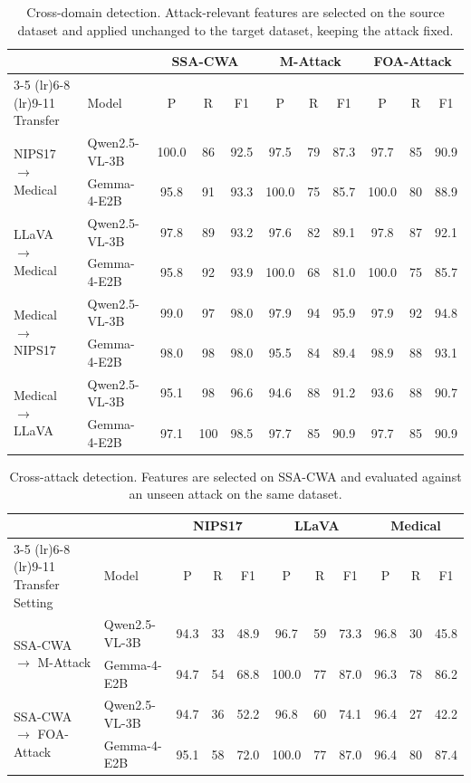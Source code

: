 \begin{table}[t]
\centering
\caption{Cross-domain detection. Attack-relevant features are selected on the source dataset and applied unchanged to the target dataset, keeping the attack fixed.}
\label{tab:appendix-cross-domain}
\begin{tabular}{llccccccccc}
\toprule
& & \multicolumn{3}{c}{SSA-CWA} & \multicolumn{3}{c}{M-Attack} & \multicolumn{3}{c}{FOA-Attack} \\
\cmidrule(lr){3-5} \cmidrule(lr){6-8} \cmidrule(lr){9-11}
Transfer & Model & P & R & F1 & P & R & F1 & P & R & F1 \\
\midrule
\multirow{2}{*}{NIPS17 $\rightarrow$ Medical}
 & Qwen2.5-VL-3B & 100.0 & 86 & 92.5 & 97.5 & 79 & 87.3 & 97.7 & 85 & 90.9 \\
 & Gemma-4-E2B & 95.8 & 91 & 93.3 & 100.0 & 75 & 85.7 & 100.0 & 80 & 88.9 \\
\midrule
\multirow{2}{*}{LLaVA $\rightarrow$ Medical}
 & Qwen2.5-VL-3B & 97.8 & 89 & 93.2 & 97.6 & 82 & 89.1 & 97.8 & 87 & 92.1 \\
 & Gemma-4-E2B & 95.8 & 92 & 93.9 & 100.0 & 68 & 81.0 & 100.0 & 75 & 85.7 \\
\midrule
\multirow{2}{*}{Medical $\rightarrow$ NIPS17}
 & Qwen2.5-VL-3B & 99.0 & 97 & 98.0 & 97.9 & 94 & 95.9 & 97.9 & 92 & 94.8 \\
 & Gemma-4-E2B & 98.0 & 98 & 98.0 & 95.5 & 84 & 89.4 & 98.9 & 88 & 93.1 \\
\midrule
\multirow{2}{*}{Medical $\rightarrow$ LLaVA}
 & Qwen2.5-VL-3B & 95.1 & 98 & 96.6 & 94.6 & 88 & 91.2 & 93.6 & 88 & 90.7 \\
 & Gemma-4-E2B & 97.1 & 100 & 98.5 & 97.7 & 85 & 90.9 & 97.7 & 85 & 90.9 \\
\bottomrule
\end{tabular}
\end{table}

\begin{table}[t]
\centering
\caption{Cross-attack detection. Features are selected on SSA-CWA and evaluated against an unseen attack on the same dataset.}
\label{tab:appendix-cross-attack}
\begin{tabular}{llccccccccc}
\toprule
& & \multicolumn{3}{c}{NIPS17} & \multicolumn{3}{c}{LLaVA} & \multicolumn{3}{c}{Medical} \\
\cmidrule(lr){3-5} \cmidrule(lr){6-8} \cmidrule(lr){9-11}
Transfer Setting & Model & P & R & F1 & P & R & F1 & P & R & F1 \\
\midrule
\multirow{2}{*}{SSA-CWA $\rightarrow$ M-Attack}
 & Qwen2.5-VL-3B & 94.3 & 33 & 48.9 & 96.7 & 59 & 73.3 & 96.8 & 30 & 45.8 \\
 & Gemma-4-E2B & 94.7 & 54 & 68.8 & 100.0 & 77 & 87.0 & 96.3 & 78 & 86.2 \\
\midrule
\multirow{2}{*}{SSA-CWA $\rightarrow$ FOA-Attack}
 & Qwen2.5-VL-3B & 94.7 & 36 & 52.2 & 96.8 & 60 & 74.1 & 96.4 & 27 & 42.2 \\
 & Gemma-4-E2B & 95.1 & 58 & 72.0 & 100.0 & 77 & 87.0 & 96.4 & 80 & 87.4 \\
\bottomrule
\end{tabular}
\end{table}

